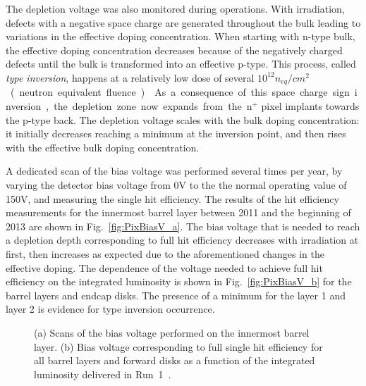 The depletion voltage was also monitored during operations.
With irradiation, defects with a negative space charge are generated throughout the bulk leading to variations in the effective doping concentration.
When starting with n-type bulk, the effective doping concentration decreases because of the negatively charged defects until the bulk is transformed into an effective p-type.
This process, called \textit{type inversion}, happens at a relatively low dose of several $10^{12}$\unit{$n_{eq}/cm^2$} (neutron equivalent fluence)~\cite{PixelDetectorsBook2006}.
As a consequence of this space charge sign inversion, the depletion zone now expands from the n$^+$ pixel implants towards the p-type back.
The depletion voltage scales with the bulk doping concentration: it initially decreases reaching a minimum at the inversion point, and then rises with the effective bulk doping concentration.

A dedicated scan of the bias voltage was performed several times per year, by varying the detector bias voltage from 0\unit{V} to the the normal operating value of 150\unit{V}, and measuring the single hit efficiency.
The results of the hit efficiency measurements for the innermost barrel layer between 2011 and the beginning of 2013 are shown in Fig.~\ref{fig:PixBiasV_a}.
The bias voltage that is needed to reach a depletion depth corresponding to full hit efficiency decreases with irradiation at first, then increases as expected due to the aforementioned changes in the effective doping.
The dependence of the voltage needed to achieve full hit efficiency on the integrated luminosity is shown in Fig.~\ref{fig:PixBiasV_b} for the barrel layers and endcap disks.
The presence of a minimum for the layer 1 and layer 2 is evidence for type inversion occurrence.\\

\begin{figure}[!htb]
 \begin{center}
 \end{center}
 \caption{(a) Scans of the bias voltage performed on the innermost barrel layer. (b) Bias voltage corresponding to full single hit efficiency for all barrel layers and forward disks as a function of the integrated luminosity delivered in Run~1~\cite{PixelOffline}.}
 \label{fig:PixBiasV}
\end{figure}

